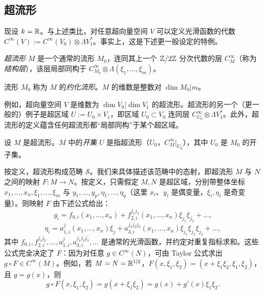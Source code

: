 
\subsection{超流形}

现设 $k=\Bbb R$。与上述类比，对任意超向量空间 $V$ 可以定义光滑函数的代数 $C^\infty(V):=C^\infty(V_0)\otimes \Lambda V_1^*$。事实上，这是下述更一般设定的特例。

\begin{definition} \emph{超流形} $M$ 是一个通常的流形 $M_0$，连同其上一个 $\Bbb Z/2\Bbb Z$ 分次代数的层 $C^\infty_{M}$（称为\emph{结构层}），该层局部同构于 $C^\infty_{M_0}\otimes \Lambda (\xi_1,...,\xi_m)$。
\end{definition}

流形 $M_0$ 称为 $M$ 的\emph{约化流形}。$M$ 的维数是整数对 $\dim M_0|m$。

例如，超向量空间 $V$ 是维数为 $\dim V_0|\dim V_1$ 的超流形。超流形的另一个（更一般的）例子是超区域 $U:=U_0\times V_1$，即区域 $U_0\subset V_0$ 连同层 $C^\infty_{U_0}\otimes \Lambda V_1^*$。此外，超流形的定义蕴含任何超流形都“局部同构”于某个超区域。

设 $M$ 是超流形。$M$ 中的\emph{开集} $U$ 是指超流形（$U_0$，$C^\infty_M|_{U_0}$），其中 $U_0$ 是 $M_0$ 的开子集。

按定义，超流形构成范畴 $\mathcal{S}$。我们来具体描述该范畴中的态射，即超流形 $M$ 与 $N$ 之间的映射 $F:M\to N$。按定义，只需假定 $M,N$ 是超区域，分别带整体坐标 $x_1,...,x_n,\xi_1,...,\xi_m$ 与 $y_1,...,y_p,\eta_1,...,\eta_q$（这里 $x_i$、$y_i$ 是偶变量，$\xi_i,\eta_i$ 是奇变量）。则映射 $F$ 由下述公式给出：
$$
y_i=f_{0,i}(x_1,...,x_n)+f_{2,i}^{j_1j_2}(x_1,...,x_n)\xi_{j_1}\xi_{j_2}+...,
$$
$$
\eta_i=a_{1,i}^j(x_1,...,x_n)\xi_j+a_{3,i}^{j_1j_2j_3}(x_1,...,x_n)
\xi_{j_1}\xi_{j_2}\xi_{j_3}+...,
$$
其中 $f_{0,i},f_{2,i}^{j_1j_2},...,a_{1,i}^j,a_{3,i}^{j_1j_2j_3},...$ 是通常的光滑函数，并约定对重复指标求和。这些公式完全决定了 $F$：因为对任意 $g\in C^\infty(N)$，可由 Taylor 公式求出 $g\circ F\in C^\infty(M)$。例如，若 $M=N=\Bbb R^{1|2}$，$F(x,\xi_1,\xi_2)=(x+\xi_1\xi_2,\xi_1,\xi_2)$，且 $g=g(x)$，则
$$
g\circ F(x,\xi_1,\xi_2)=
g(x+\xi_1\xi_2)=g(x)+g'(x)\xi_1\xi_2.
$$

